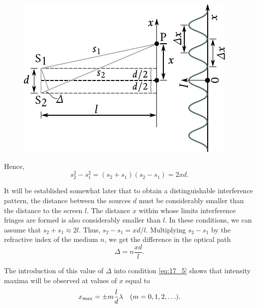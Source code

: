 \begin{figure}[t]
	\begin{center}
		\includegraphics[scale=0.95]{figures/ch_17/fig_17_2.pdf}
		\caption[]{}
		\label{fig:17_2}
	\end{center}
	\vspace{-0.9cm}
\end{figure}

\noindent
Hence,
\begin{equation*}
    s_2^2 - s_1^2 = (s_2 + s_1) (s_2 - s_1) = 2xd.
\end{equation*}

It will be established somewhat later that to obtain a distinguishable interference pattern, the distance between the sources $d$ must be considerably smaller than the distance to the screen $l$.
The distance $x$ within whose limits interference fringes are formed is also considerably smaller than $l$.
In these conditions, we can assume that $s_2+s_1 \approx 2l$.
Thus, $s_2-s_1=xd/l$.
Multiplying $s_2-s_1$ by the refractive index of the medium $n$, we get the difference in the optical path
\begin{equation}\label{eq:17_7}
    \Delta = n \frac{xd}{l}.
\end{equation}

\noindent
The introduction of this value of $\Delta$ into condition \eqref{eq:17_5} shows that intensity maxima will be observed at values of $x$ equal to
\begin{equation}\label{eq:17_8}
    x_{\text{max}} = \pm m \frac{l}{d} \lambda \quad (m = 0, 1, 2, \ldots).
\end{equation}

